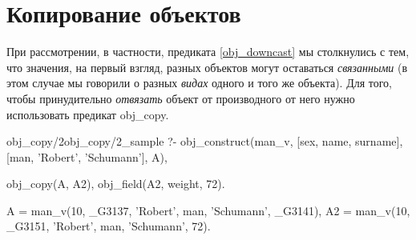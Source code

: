 \documentclass[a4paper]{book}
\begin{document}
\section{Копирование объектов}
\label{obj_copy}

При рассмотрении, в частности, предиката \ref{obj_downcast} мы столкнулись с
тем, что значения, на первый взгляд, разных объектов могут оставаться {\it
  связанными\/} (в этом случае мы говорили о разных {\it видах} одного и того
же объекта). Для того, чтобы принудительно {\it отвязать\/} объект от
производного от него нужно использовать предикат obj_copy. 

\begin{example}{obj_copy/2}{obj_copy/2_sample}
?- obj_construct(man_v, 
      [sex, name, surname], 
      [man, 'Robert', 'Schumann'], A), 

   obj_copy(A, A2), 
   obj_field(A2, weight, 72).                     

A = man_v(10, _G3137, 'Robert', man, 'Schumann', _G3141),
A2 = man_v(10, _G3151, 'Robert', man, 'Schumann', 72).
\end{example}

\begin{comment}
и 

\begin{example}{obj_copy/3}{obj_copy/3_sample}
?- obj_construct(man_v, 
      [sex, name, surname], 
      [man, 'Robert', 'Schumann'], A), 
    
   obj_copy([sex, name], A, A2),                              
   obj_field(A2, weight, 72).

A = man_v(man, 'Robert', 'Schumann', _G18, _G19),
A2 = man_v(man, 'Robert', _G131, 72, _G133).
\end{example}

Внимательный читатель заметит, что предикат obj_copy/3 является
как-бы инверсией obj_reset_fields/3 с тем лишь отличием, что в
первом перечисляются поля, которые необходимо сохранить, а во
втором - которые необходимо очистить. А obj_copy/2 эквивалентен
вызову obj_reset_fields/3 с пустым списком полей. Однако это не
так.

\subsection{Объекты со сложной семантикой копирования}
\label{limited_types}

(пример со странами и гражданами)

\section{Поля с типами}

....
\section{Формат файла-определения объекта}
\label{object_file_format}

\end{comment}
\end{document}
